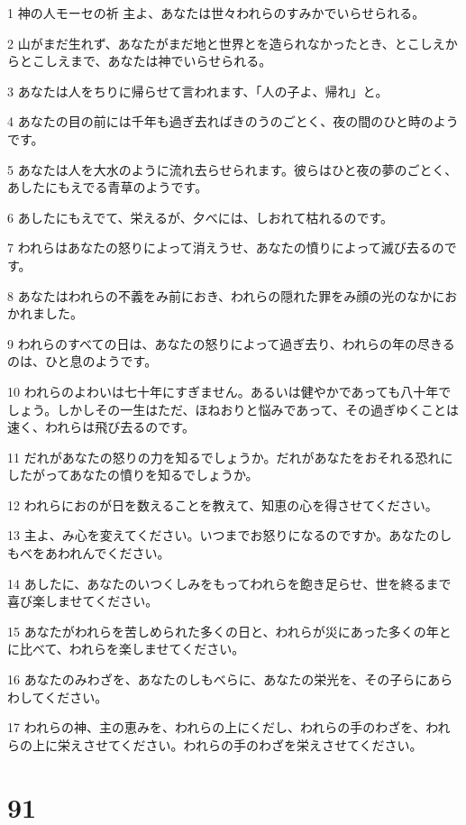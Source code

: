 \par 1 神の人モーセの祈 主よ、あなたは世々われらのすみかでいらせられる。
\par 2 山がまだ生れず、あなたがまだ地と世界とを造られなかったとき、とこしえからとこしえまで、あなたは神でいらせられる。
\par 3 あなたは人をちりに帰らせて言われます、「人の子よ、帰れ」と。
\par 4 あなたの目の前には千年も過ぎ去ればきのうのごとく、夜の間のひと時のようです。
\par 5 あなたは人を大水のように流れ去らせられます。彼らはひと夜の夢のごとく、あしたにもえでる青草のようです。
\par 6 あしたにもえでて、栄えるが、夕べには、しおれて枯れるのです。
\par 7 われらはあなたの怒りによって消えうせ、あなたの憤りによって滅び去るのです。
\par 8 あなたはわれらの不義をみ前におき、われらの隠れた罪をみ顔の光のなかにおかれました。
\par 9 われらのすべての日は、あなたの怒りによって過ぎ去り、われらの年の尽きるのは、ひと息のようです。
\par 10 われらのよわいは七十年にすぎません。あるいは健やかであっても八十年でしょう。しかしその一生はただ、ほねおりと悩みであって、その過ぎゆくことは速く、われらは飛び去るのです。
\par 11 だれがあなたの怒りの力を知るでしょうか。だれがあなたをおそれる恐れにしたがってあなたの憤りを知るでしょうか。
\par 12 われらにおのが日を数えることを教えて、知恵の心を得させてください。
\par 13 主よ、み心を変えてください。いつまでお怒りになるのですか。あなたのしもべをあわれんでください。
\par 14 あしたに、あなたのいつくしみをもってわれらを飽き足らせ、世を終るまで喜び楽しませてください。
\par 15 あなたがわれらを苦しめられた多くの日と、われらが災にあった多くの年とに比べて、われらを楽しませてください。
\par 16 あなたのみわざを、あなたのしもべらに、あなたの栄光を、その子らにあらわしてください。
\par 17 われらの神、主の恵みを、われらの上にくだし、われらの手のわざを、われらの上に栄えさせてください。われらの手のわざを栄えさせてください。

\chapter{91}

